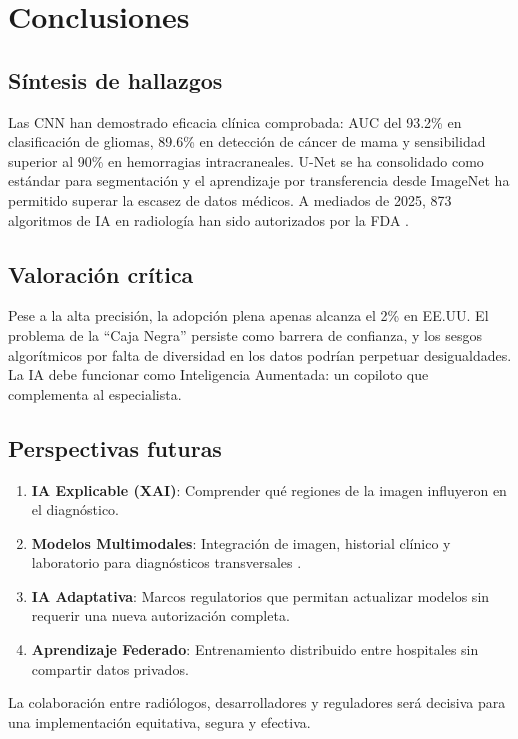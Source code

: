 \section{Conclusiones}

\subsection{Síntesis de hallazgos}

Las CNN han demostrado eficacia clínica comprobada: AUC del 93.2\% en clasificación de gliomas, 89.6\% en detección de cáncer de mama y sensibilidad superior al 90\% en hemorragias intracraneales. U-Net se ha consolidado como estándar para segmentación y el aprendizaje por transferencia desde ImageNet ha permitido superar la escasez de datos médicos. A mediados de 2025, 873 algoritmos de IA en radiología han sido autorizados por la FDA \parencite{Laurent2025}.

\subsection{Valoración crítica}

Pese a la alta precisión, la adopción plena apenas alcanza el 2\% en EE.UU. El problema de la ``Caja Negra'' persiste como barrera de confianza, y los sesgos algorítmicos por falta de diversidad en los datos podrían perpetuar desigualdades. La IA debe funcionar como Inteligencia Aumentada: un copiloto que complementa al especialista.

\subsection{Perspectivas futuras}

\begin{enumerate}
    \item \textbf{IA Explicable (XAI)}: Comprender qué regiones de la imagen influyeron en el diagnóstico.
    \item \textbf{Modelos Multimodales}: Integración de imagen, historial clínico y laboratorio para diagnósticos transversales \parencite{Laurent2025}.
    \item \textbf{IA Adaptativa}: Marcos regulatorios que permitan actualizar modelos sin requerir una nueva autorización completa.
    \item \textbf{Aprendizaje Federado}: Entrenamiento distribuido entre hospitales sin compartir datos privados.
\end{enumerate}

La colaboración entre radiólogos, desarrolladores y reguladores será decisiva para una implementación equitativa, segura y efectiva.
